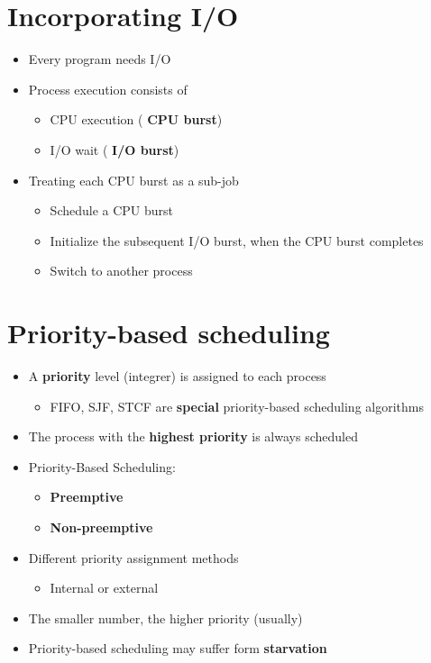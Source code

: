 \documentclass[a4paper,11pt,english]{article}
\begin{document}


\section*{Incorporating I/O}
\begin{itemize}
    \item Every program needs I/O
    \item Process execution consists of
        \begin{itemize}
            \item CPU execution (\textbf{\color{blue} CPU burst})
            \item I/O wait (\textbf{\color{blue} I/O burst})
        \end{itemize}
    \item Treating each CPU burst as a sub-job
        \begin{itemize}
            \item Schedule a CPU burst
            \item Initialize the subsequent I/O burst, when the CPU burst completes
            \item Switch to another process
        \end{itemize}
\end{itemize}

\section*{Priority-based scheduling}
\begin{itemize}
    \item A \textbf{\color{blue} priority} level (integrer) is assigned to each process
        \begin{itemize}
            \item FIFO, SJF, STCF are \textbf{\color{red} special} priority-based scheduling algorithms 
        \end{itemize}
    \item The process with the \textbf{\color{blue} highest priority} is always scheduled
    \item Priority-Based Scheduling:
        \begin{itemize}
            \item \textbf{\color{blue} Preemptive}
            \item \textbf{\color{blue} Non-preemptive}
        \end{itemize}
    \item Different priority assignment methods
        \begin{itemize}
            \item Internal or external
        \end{itemize}
    \item The smaller number, the higher priority (usually)
    \item Priority-based scheduling may suffer form \textbf{\color{red} starvation}
\end{itemize}
\end{document}

